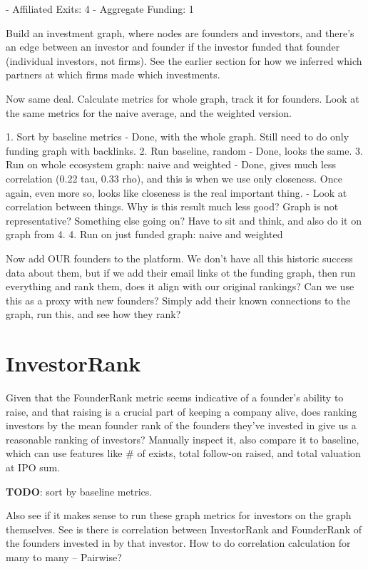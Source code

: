 - Affiliated Exits: 4
- Aggregate Funding: 1

Build an investment graph, where nodes are founders and investors, and there's an edge between an investor and founder if the investor funded that founder (individual investors, not firms). See the earlier section for how we inferred which partners at which firms made which investments.

Now same deal. Calculate metrics for whole graph, track it for founders. Look at the same metrics for the naive average, and the weighted version.

1. Sort by baseline metrics
  - Done, with the whole graph. Still need to do only funding graph with backlinks.
2. Run baseline, random
  - Done, looks the same.
3. Run on whole ecosystem graph: naive and weighted
  - Done, gives much less correlation (0.22 tau, 0.33 rho), and this is when we use only closeness. Once again, even more so, looks like closeness is the real important thing.
  - Look at correlation between things. Why is this result much less good? Graph is not representative? Something else going on? Have to sit and think, and also do it on graph from 4.
4. Run on just funded graph: naive and weighted


Now add OUR founders to the platform. We don't have all this historic success data about them, but if we add their email links ot the funding graph, then run everything and rank them, does it align with our original rankings? Can we use this as a proxy with new founders? Simply add their known connections to the graph, run this, and see how they rank?

\section{InvestorRank}

Given that the FounderRank metric seems indicative of a founder's ability to raise, and that raising is a crucial part of keeping a company alive, does ranking investors by the mean founder rank of the founders they've invested in give us a reasonable ranking of investors? Manually inspect it, also compare it to baseline, which can use features like \# of exists, total follow-on raised, and total valuation at IPO sum.

\textbf{TODO}: sort by baseline metrics.

Also see if it makes sense to run these graph metrics for investors on the graph themselves. See is there is correlation between InvestorRank and FounderRank of the founders invested in by that investor. How to do correlation calculation for many to many -- Pairwise?
